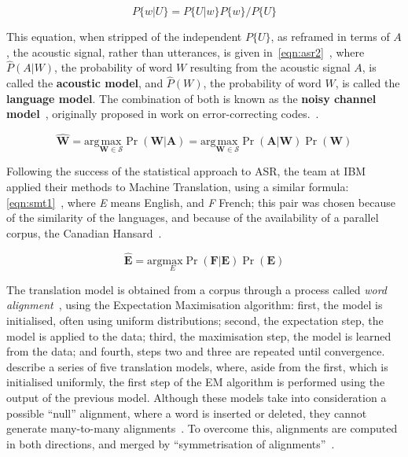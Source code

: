 \begin{equation}
\label{eqn:asr1}
P\{w|U\}=P\{U|w\}P\{w\}/P\{U\}
\end{equation}

This equation, when stripped of the independent $P\{U\}$, as reframed in terms of $A$, the acoustic
signal, rather than utterances, is given in~\ref{eqn:asr2}~\citep[p. 487]{Jelinek2009dawn}, where
$\hat{P}(A|W)$, the probability of word $W$ resulting from the acoustic signal $A$, is called the
\textbf{acoustic model}, and $\hat{P}(W)$, the probability of word $W$, is called the \textbf{language model}.
The combination of both is known as the \textbf{noisy channel model}~\citep[pp. 95--96]{koehn2010statistical},
originally proposed in work on error-correcting codes.~\citep{6773024}.

\begin{equation}
\label{eqn:asr2}
\mathbf{\hat{W}} = \mathrm{arg} \underset{\mathbf{W} \in \mathcal{S}}{\mathrm{max}} \Pr{(\mathbf{W}|\mathbf{A})} =  \mathrm{arg} \underset{\mathbf{W} \in \mathcal{S}}{\mathrm{max}} \Pr{(\mathbf{A}|\mathbf{W})} \Pr{(\mathbf{W})}
\end{equation}

Following the success of the statistical approach to ASR, the team at IBM applied their methods to Machine 
Translation, using a similar formula: \ref{eqn:smt1}~\citep[p. 492]{Jelinek2009dawn}, where \textit{E} means English, and \textit{F} French;
this pair was chosen because of the similarity of the languages, and because of the availability of a parallel corpus,
the Canadian Hansard~\citep[p. 493]{Jelinek2009dawn}.

\begin{equation}
\label{eqn:smt1}
\mathbf{\hat{E}} = \mathrm{arg} \underset{E}{\mathrm{max}} \Pr{(\mathbf{F}|\mathbf{E})} \Pr{(\mathbf{E})}
\end{equation}

The translation model is obtained from a corpus through a process called \textit{word alignment}~\citep{brown1993}, 
using the Expectation Maximisation algorithm: first, the model is initialised, often using uniform distributions;
second, the expectation step, the model is applied to the data; third, the maximisation step, the model is learned
from the data; and fourth, steps two and three are repeated until convergence. \citet{brown1993} describe a series
of five translation models, where, aside from the first, which is initialised uniformly, the first step of the EM
algorithm is performed using the output of the previous model. Although these models take into consideration a
possible ``null'' alignment, where a word is inserted or deleted, they cannot generate many-to-many 
alignments~\citep[p. 116]{koehn2010statistical}. To overcome this, alignments are computed in both directions, and
merged by ``symmetrisation of alignments''~\citep{och2004alignment}.

